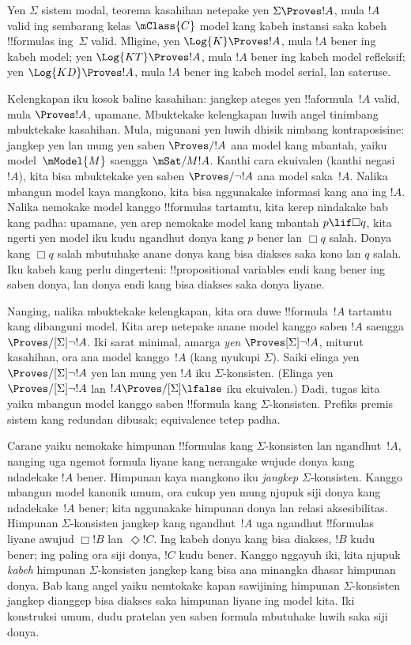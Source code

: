 \documentclass[../../../include/open-logic-section]{subfiles}
\begin{document}


Yen $\Sigma$ sistem modal, teorema kasahihan netepake yen
$\Sigma \Proves !A$, mula $!A$ valid ing sembarang kelas
$\mClass{C}$ model kang kabeh instansi saka kabeh !!{formula}s
ing~$\Sigma$ valid. Mligine, yen $\Log{K}
\Proves !A$, mula $!A$ bener ing kabeh model; yen $\Log{KT} \Proves !A$,
mula $!A$ bener ing kabeh model refleksif; yen $\Log{KD} \Proves !A$,
mula $!A$ bener ing kabeh model serial, lan sateruse.

Kelengkapan iku kosok baline kasahihan:  jangkep
ateges yen !!a{formula}~$!A$ valid, mula $\Proves !A$, upamane.
Mbuktekake kelengkapan luwih angel tinimbang mbuktekake kasahihan.
Mula, migunani yen luwih dhisik nimbang kontraposisine: 
jangkep yen lan mung yen saben $\Proves/ !A$ ana model kang mbantah,
yaiku model~$\mModel{M}$ saengga $\mSat/{M}{!A}$. Kanthi cara
ekuivalen (kanthi negasi $!A$), kita bisa mbuktekake yen saben
$\Proves/ \lnot !A$ ana model saka~$!A$. Nalika mbangun model kaya
mangkono, kita bisa nggunakake informasi kang ana ing $!A$. Nalika
nemokake model kanggo !!{formula}s tartamtu, kita kerep nindakake bab
kang padha: upamane, yen arep nemokake model kang mbantah
$p \lif \Box q$, kita ngerti yen model iku kudu ngandhut donya kang
$p$ bener lan $\Box q$ salah. Donya kang $\Box q$ salah mbutuhake
anane donya kang bisa diakses saka kono lan $q$ salah. Iku kabeh kang
perlu dingerteni: !!{propositional variable}s endi kang bener ing saben
donya, lan donya endi kang bisa diakses saka donya liyane.

Nanging, nalika mbuktekake kelengkapan, kita ora duwe
!!{formula}~$!A$ tartamtu kang dibanguni model. Kita arep netepake
anane model kanggo saben $!A$ saengga
$\Proves/[\Sigma] \lnot !A$. Iki sarat minimal, amarga
\emph{yen} $\Proves[\Sigma] \lnot !A$, miturut kasahihan, ora ana model
kanggo~$!A$ (kang nyukupi $\Sigma$). Saiki elinga yen $\Proves/[\Sigma]
\lnot !A$ yen lan mung yen $!A$ iku $\Sigma$-konsisten. (Elinga yen
$\Proves/[\Sigma] \lnot !A$ lan $!A \Proves/[\Sigma] \lfalse$ iku
ekuivalen.) Dadi, tugas kita yaiku mbangun model kanggo saben
!!{formula} kang $\Sigma$-konsisten. Prefiks premis sistem kang redundan dibusak; equivalence tetep padha.

Carane yaiku nemokake himpunan !!{formula}s kang
$\Sigma$-konsisten lan ngandhut~$!A$, nanging uga ngemot formula
liyane kang nerangake wujude donya kang ndadekake $!A$ bener. Himpunan
kaya mangkono iku \emph{jangkep} $\Sigma$-konsisten. Kanggo mbangun model kanonik umum, ora cukup yen mung njupuk siji
donya kang ndadekake~$!A$ bener; kita nggunakake himpunan donya lan
relasi aksesibilitas. Himpunan
$\Sigma$-konsisten jangkep kang ngandhut~$!A$ uga ngandhut
!!{formula}s liyane awujud $\Box !B$ lan~$\Diamond !C$. Ing kabeh
donya kang bisa diakses, $!B$ kudu bener; ing paling ora siji donya,
$!C$ kudu bener. Kanggo nggayuh iki, kita njupuk \emph{kabeh}
himpunan $\Sigma$-konsisten jangkep kang bisa ana minangka dhasar
himpunan donya. Bab kang angel yaiku nemtokake kapan sawijining
himpunan $\Sigma$-konsisten jangkep dianggep bisa diakses saka
himpunan liyane ing model kita. Iki konstruksi umum, dudu pratelan yen saben formula mbutuhake luwih saka siji donya.
\end{document}
